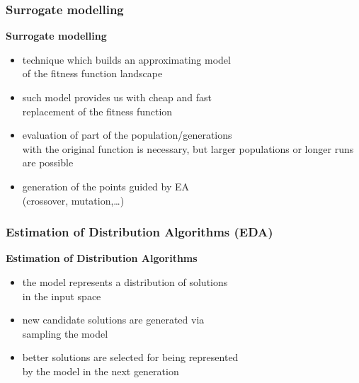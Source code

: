 \documentclass[sans,mathserif]{beamer}
\newcommand{\blue}[1]{{\color{blue} #1}}
\begin{document}

\begin{frame}
  \frametitle{Surrogate modelling}
  \textbf{Surrogate modelling}
  \begin{itemize}
    \item technique which builds an \alert{approximating model} \\
      of the fitness function landscape
    \item such model provides us with \alert{cheap and fast} \\
      replacement of the fitness function
    \item evaluation of \blue{part} of the population/generations \\ with the \blue{original
      function} is necessary, but \alert{larger populations} or longer runs are possible
    \item generation of the points guided by EA \\
      (crossover, mutation,\ldots)
  \end{itemize}
\end{frame}

\begin{frame}
  \frametitle{Estimation of Distribution Algorithms (EDA)}
  \textbf{Estimation of Distribution Algorithms}
  \begin{itemize}
    \item the model represents a \alert{distribution} of solutions \\ in the \blue{input space}
    \item new candidate solutions are generated via \\ \alert{sampling the model}
    \item better solutions are selected for being represented \\ by the model in the next generation 
  \end{itemize}
\end{frame}
\end{document}
